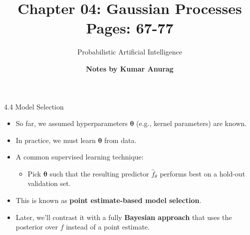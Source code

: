 \documentclass[handout,aspectratio=169]{beamer}
\title{
Chapter 04: Gaussian Processes \\ Pages: 67-77
}
\author{\bf Notes by Kumar Anurag}
\date{}
\subtitle{
Probabilistic Artificial Intelligence
}
\begin{document}
{
	\begin{frame}
		\maketitle
	\end{frame}}



\begin{frame}{4.4 Model Selection}
\begin{itemize}
    \item So far, we assumed hyperparameters $\boldsymbol{\theta}$ (e.g., kernel parameters) are known.
    \item In practice, we must learn $\boldsymbol{\theta}$ from data.
    \item A common supervised learning technique:
    \begin{itemize}
        \item Pick $\boldsymbol{\theta}$ such that the resulting predictor $\hat{f}_\theta$ performs best on a hold-out validation set.
    \end{itemize}
    \item This is known as \textbf{point estimate-based model selection}.
    \item Later, we’ll contrast it with a fully \textbf{Bayesian approach} that uses the posterior over $f$ instead of a point estimate.
\end{itemize}
\pause
\vspace{0.3cm}

\end{frame}
\end{document}
